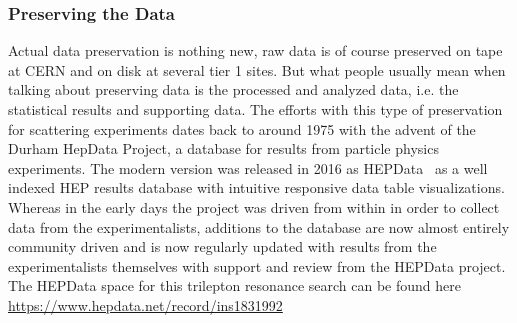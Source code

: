 \subsubsection{Preserving the Data}
Actual data preservation is nothing new, raw data is of course preserved on tape at CERN and on disk at several tier 1 sites. 
But what people usually mean when talking about preserving data is the processed and analyzed data, i.e. the statistical results and supporting data.
The efforts with this type of preservation for scattering experiments dates back to around 1975 with the advent of the Durham HepData Project, a database for results from particle physics experiments. 
The modern version was released in 2016 as \mbox{HEPData}~\cite{hepdata:2021} as a well indexed HEP results database with intuitive responsive data table visualizations. 
Whereas in the early days the project was driven from within in order to collect data from the experimentalists, additions to the database are now almost entirely community driven and is now regularly updated with results from the experimentalists themselves with support and review from the HEPData project.
The HEPData space for this trilepton resonance search can be found here \href{https://www.hepdata.net/record/ins1831992}{https://www.hepdata.net/record/ins1831992}

